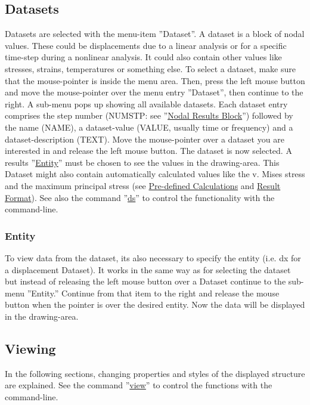 \documentclass{article}
\providecommand{\htmlref}[2]{\hyperref[#2]{#1}}
\begin{document}
\subsection{\label{Datasets}Datasets}
Datasets are selected with the menu-item ''Dataset''. A dataset is a block of nodal values. These could be displacements due to a linear analysis or for a specific time-step during a nonlinear analysis. It could also contain other values like stresses, strains, temperatures or something else. To select a dataset, make sure that the mouse-pointer is inside the menu area. Then, press the left mouse button and move the mouse-pointer over the menu entry ''Dataset'', then continue to the right. A sub-menu pops up showing all available datasets. Each dataset entry comprises the step number (NUMSTP: see ''\htmlref{Nodal Results Block}{Nodal Results Block}'') followed by the name (NAME), a dataset-value (VALUE, usually time or frequency) and a dataset-description (TEXT). Move the mouse-pointer over a dataset you are interested in and release the left mouse button. The dataset is now selected. A results ''\htmlref{Entity}{Entity}'' must be chosen to see the values in the drawing-area. This Dataset might also contain automatically calculated values like the v. Mises stress and the maximum principal stress (see \htmlref{Pre-defined Calculations}{Pre-defined Calculations} and \htmlref{Result Format}{Result Format}). See also the command ''\htmlref{ds}{ds}'' to control the functionality with the command-line.

\subsubsection{\label{Entity}Entity}
To view data from the dataset, its also necessary to specify the entity (i.e. dx for a displacement Dataset). It works in the same way as for selecting the dataset but instead of releasing the left mouse button over a Dataset continue to the sub-menu ''Entity.''  Continue from that item to the right and release the mouse button when the pointer is over the desired entity.  Now the data will be displayed in the drawing-area.

\subsection{\label{Viewing}Viewing}
In the following sections, changing properties and styles of the displayed structure are explained. See the command ''\htmlref{view}{view}'' to control the functions with the command-line.
\end{document}
